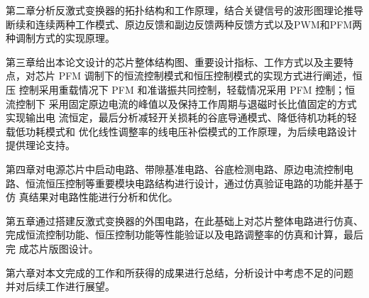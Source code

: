 第二章分析反激式变换器的拓扑结构和工作原理，结合关键信号的波形图理论推导断续和连续两种工作模式、原边反馈和副边反馈两种反馈方式以及PWM和PFM两种调制方式的实现原理。 

第三章给出本论文设计的芯片整体结构图、重要设计指标、工作方式以及主要特 点，对芯片 PFM 调制下的恒流控制模式和恒压控制模式的实现方式进行阐述，恒压 控制采用重载情况下 PFM 和准谐振共同控制，轻载情况采用 PFM 控制；恒流控制下 采用固定原边电流的峰值以及保持工作周期与退磁时长比值固定的方式实现输出电 流恒定，最后分析减轻开关损耗的谷底导通模式、降低待机功耗的轻载低功耗模式和 优化线性调整率的线电压补偿模式的工作原理，为后续电路设计提供理论支持。 

第四章对电源芯片中启动电路、带隙基准电路、谷底检测电路、原边电流控制电 路、恒流恒压控制等重要模块电路结构进行设计，通过仿真验证电路的功能并基于仿 真结果对电路性能进行分析和优化。 

第五章通过搭建反激式变换器的外围电路，在此基础上对芯片整体电路进行仿真、 完成恒流控制功能、恒压控制功能等性能验证以及电路调整率的仿真和计算，最后完 成芯片版图设计。 

第六章对本文完成的工作和所获得的成果进行总结，分析设计中考虑不足的问题 并对后续工作进行展望。














